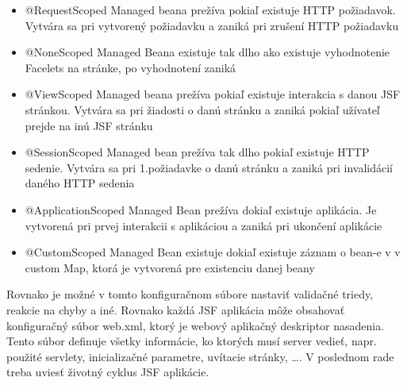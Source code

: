 \begin{itemize}
\item @RequestScoped Managed beana prežíva pokiaľ  existuje HTTP požiadavok. Vytvára sa pri vytvorený požiadavku a zaniká pri zrušení HTTP požiadavku
\item @NoneScoped Managed Beana existuje tak dlho ako existuje vyhodnotenie Facelets na stránke, po vyhodnotení zaniká
\item @ViewScoped Managed beana prežíva pokiaľ existuje interakcia s danou JSF stránkou. Vytvára sa pri žiadosti o danú stránku a zaniká pokiaľ užívateľ prejde na inú JSF stránku
\item @SessionScoped Managed bean prežíva tak dlho pokiaľ existuje HTTP sedenie. Vytvára sa pri 1.požiadavke o danú stránku a zaniká pri invalidácií daného HTTP sedenia
\item @ApplicationScoped Managed Bean prežíva dokiaľ existuje aplikácia. Je vytvorená pri prvej interakcii s aplikáciou a zaniká pri ukončení aplikácie
\item @CustomScoped Managed Bean existuje dokiaľ existuje záznam o bean-e v v custom Map, ktorá je vytvorená pre existenciu danej beany
\end{itemize}
Rovnako je možné v tomto konfiguračnom súbore nastaviť validačné triedy, reakcie na chyby a iné. Rovnako každá JSF aplikácia môže obsahovať konfiguračný súbor web.xml, ktorý je webový aplikačný deskriptor nasadenia. Tento súbor definuje všetky informácie, ko ktorých musí server vedieť, napr. použité servlety, inicializačné parametre, uvítacie stránky, \ldots. V poslednom rade treba uviesť životný cyklus JSF aplikácie.

